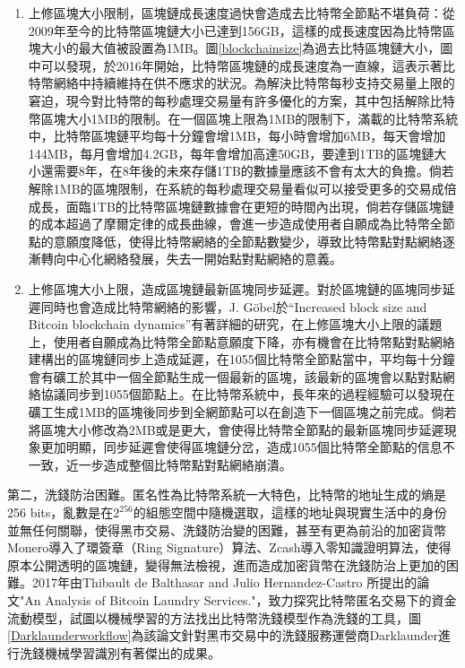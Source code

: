 					\begin{enumerate}
						\item 上修區塊大小限制，區塊鏈成長速度過快會造成去比特幣全節點不堪負荷：從2009年至今的比特幣區塊鏈大小已達到156GB，這樣的成長速度因為比特幣區塊大小的最大值被設置為1MB。圖\ref{blockchainsize}為過去比特區塊鏈大小，圖中可以發現，於2016年開始，比特幣區塊鏈的成長速度為一直線，這表示著比特幣網絡中持續維持在供不應求的狀況。為解決比特幣每秒⽀持交易量上限的窘迫，現今對⽐特幣的每秒處理交易量有許多優化的⽅案，其中包括解除比特幣區塊大小1MB的限制。在一個區塊上限為1MB的限制下，滿載的比特幣系統中，比特幣區塊鏈平均每十分鐘會增1MB，每小時會增加6MB，每天會增加144MB，每月會增加4.2GB，每年會增加高達50GB，要達到1TB的區塊鏈大小還需要8年，在8年後的未來存儲1TB的數據量應該不會有太大的負擔。倘若解除1MB的區塊限制，在系統的每秒處理交易量看似可以接受更多的交易成倍成長，面臨1TB的比特幣區塊鏈數據會在更短的時間內出現，倘若存儲區塊鏈的成本超過了摩爾定律的成長曲線，會進一步造成使用者自願成為比特幣全節點的意願度降低，使得比特幣網絡的全節點數變少，導致比特幣點對點網絡逐漸轉向中心化網絡發展，失去一開始點對點網絡的意義。

						\item 上修區塊大小上限，造成區塊鏈最新區塊同步延遲。對於區塊鏈的區塊同步延遲同時也會造成比特幣網絡的影響，J. Göbel於“Increased block size and Bitcoin blockchain dynamics”\supercite{TelecommunicationNetworksandApplicationsConferenceITNAC201727thInternational}有著詳細的研究，在上修區塊大小上限的議題上，使用者自願成為比特幣全節點意願度下降，亦有機會在比特幣點對點網絡建構出的區塊鏈同步上造成延遲，在1055個比特幣全節點當中，平均每十分鐘會有礦工於其中一個全節點生成一個最新的區塊，該最新的區塊會以點對點網絡協議同步到1055個節點上。在比特幣系統中，長年來的過程經驗可以發現在礦工生成1MB的區塊後同步到全網節點可以在創造下一個區塊之前完成。倘若將區塊大小修改為2MB或是更大，會使得比特幣全節點的最新區塊同步延遲現象更加明顯，同步延遲會使得區塊鏈分岔，造成1055個比特幣全節點的信息不一致，近一步造成整個比特幣點對點網絡崩潰。
					\end{enumerate}
					

				第二，洗錢防治困難。匿名性為比特幣系統一大特色，比特幣的地址生成的熵是256 bits，亂數是在$2^{256}$的組態空間中隨機選取，這樣的地址與現實生活中的身份並無任何關聯，使得黑市交易、洗錢防治變的困難，甚至有更為前沿的加密貨幣Monero\supercite{noether2014monero}導入了環簽章（Ring Signature）\supercite{Thresholdringsignaturesandapplicationstoad-hocgroups}算法、Zcash\supercite{zhong2002faster}導入零知識證明算法\supercite{Zero-KnowledgeProofsofIdentity}，使得原本公開透明的區塊鏈，變得無法檢視，進而造成加密貨幣在洗錢防治上更加的困難。2017年由Thibault de Balthasar and Julio Hernandez-Castro 所提出的論文"An Analysis of Bitcoin Laundry Services."\supercite{AnAnalysisofBitcoinLaundryServices}，致⼒探究⽐特幣匿名交易下的資⾦流動模型，試圖以機械學習的方法找出比特幣洗錢模型作為洗錢的工具，圖\ref{Darklaunderworkflow}為該論文針對黑市交易中的洗錢服務運營商Darklaunder進行洗錢機械學習識別有著傑出的成果。

